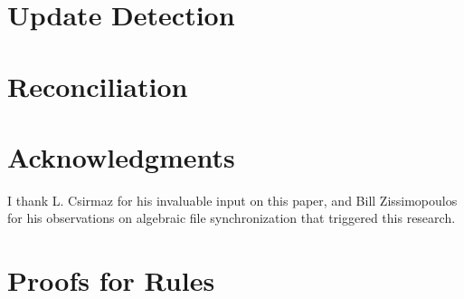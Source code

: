 \documentclass[12pt]{article}
\begin{document}


\section{Update Detection}







\section{Reconciliation}















\section{Acknowledgments}

I thank L. Csirmaz for his invaluable input on this paper,
and Bill Zissimopoulos for his observations on algebraic file synchronization that triggered this research.

\begin{thebibliography}{99}



\end{thebibliography}

\appendix

\section{Proofs for Rules}

\end{document}
